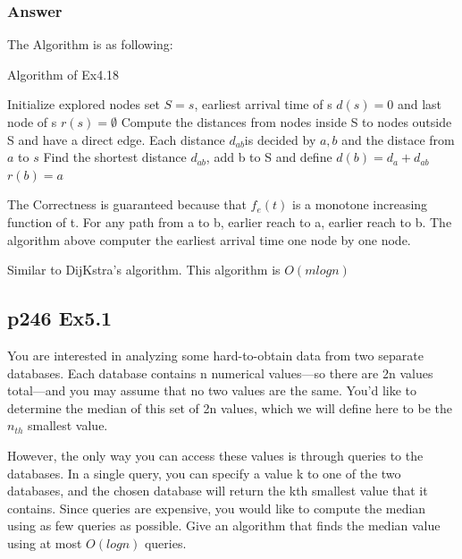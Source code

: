 \documentclass[a4paper]{article}
\begin{document}
\subsubsection*{Answer}
The Algorithm is as following:
\begin{algorithm}[!htb]
	\caption{Algorithm of Ex4.18}
	\begin{algorithmic}[1]
		\State Initialize explored nodes set $S = {s}$, earliest arrival time of s $d(s)=0$ and last node of s $r(s) = \emptyset$
		\State Compute the distances from nodes inside S to nodes outside S and have a direct edge. Each distance $d_{ab}$is decided by $a, b$ and the distace from $a$ to $s$
		\State Find the shortest distance $d_{ab}$, add b to S and define $d(b)=d_a+d_{ab}$ $r(b)=a$
		\EndWhile\\
		\Return
	\end{algorithmic}
\end{algorithm}
\par The Correctness is guaranteed because that $f_e(t)$ is a
monotone increasing function of t. For any path from a to b, earlier reach to a, earlier reach to b. The algorithm above computer the earliest arrival time one node by one node.
\par Similar to DijKstra's algorithm. This algorithm is $O(mlogn)$
\vspace{2cm}


\subsection*{p246 Ex5.1}
\begin{adjustwidth}{1cm}{1cm}
	You are interested in analyzing some hard-to-obtain data from two separate
	databases. Each database contains n numerical values—so there are
	2n values total—and you may assume that no two values are the same.
	You’d like to determine the median of this set of 2n values, which we will
	define here to be the $n_{th}$ smallest value.
	\par However, the only way you can access these values is through queries
	to the databases. In a single query, you can specify a value k to one of the
	two databases, and the chosen database will return the kth smallest value
	that it contains. Since queries are expensive, you would like to compute
	the median using as few queries as possible.
	Give an algorithm that finds the median value using at most $O(log n)$
	queries.
\end{adjustwidth}
\end{document}
